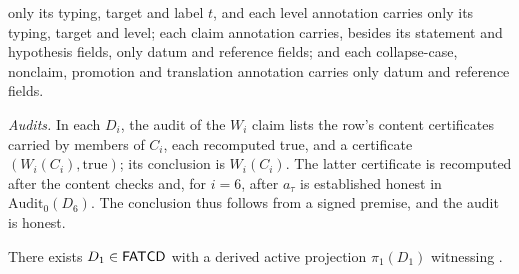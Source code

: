 only its typing, target and label \(t\), and each level annotation carries only
its typing, target and level; each claim annotation carries, besides its
statement and hypothesis fields, only datum and reference fields; and each
collapse-case, nonclaim, promotion and translation annotation carries only
datum and reference fields. \par\emph{Audits.} In each \(D_i\), the audit of the \(W_i\) claim
lists the row's content certificates carried by members of \(C_i\), each
recomputed true, and a certificate \((W_i(C_i),\mathrm{true})\); its conclusion
is \(W_i(C_i)\). The latter certificate is recomputed after the content checks
and, for \(i=6\), after \(a_\tau\) is established honest in
\(\mathrm{Audit}_0(D_6)\). The conclusion thus follows from a signed premise,
and the audit is honest.

\begin{proposition}\label{prop:p1-witness}
There exists \(D_1 \in \mathsf{FATCD}{}\) with a derived active projection
\(\pi_1(D_1)\) witnessing \Pone{}.
\end{proposition}

